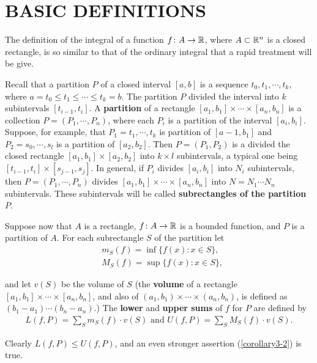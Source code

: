 \section[\textsc{basic definitions}]{BASIC DEFINITIONS}
The definition of the integral of a function $f\colon{} A\to \mathbb{R}$, where $A\subset \mathbb{R}^n$
is a closed rectangle, is so similar to that of the ordinary integral that 
a rapid treatment will be give.

Recall that a partition $P$ of a closed interval $[a,b]$ is a
sequence $t_0, t_1, \cdots, t_k$, where $a=t_0\le t_1 \le \cdots \le t_k=b$.
The partition $P$ divided the interval into $k$ subintervals $[t_{i-1}, t_i]$.
A \textbf{partition} of a rectangle $[a_1, b_1]\times \cdots \times [a_n, b_n]$
is a collection $P=(P_1, \cdots, P_n)$, where each $P_i$ is a partition of the interval 
$[a_i, b_i]$. Suppose, for example, that $P_1=t_1,\cdots, t_k$ is partition of 
$[a-1, b_1]$ and $P_2=s_0, \cdots, s_l$ is a partition of $[a_2, b_2]$. Then 
$P=(P_1, P_2)$ is a divided the closed rectangle $[a_1, b_1]\times [a_2,b_2]$ into 
$k\times l$ subintervals, a typical one being $[t_{i-1}, t_i]\times [s_{j-1}, s_j]$.
In general, if $P_i$ divides $[a_i, b_i]$ into $N_i$ subintervals, then 
$P=(P_1, \cdots, P_n)$ divides $[a_1, b_1]\times \cdots \times [a_n, b_n]$ into 
$N = N_1 \cdots N_n$ subintervals. These subintervals will be called 
\textbf{subrectangles of the partition} $P$. 

Suppose now that $A$ is a rectangle, $f\colon{} A\to \mathbb{R}$ is a bounded function, and $P$ is a 
partition of $A$. For each subrectangle $S$ of the partition let
\begin{align*}
    & {m}_S(f) = \inf \{f(x):x\in S\},\\
    & {M}_S(f) = \sup \{f(x):x\in S\},
\end{align*}

and let $v(S)$ be the volume of $S$ (the \textbf{volume} of a rectangle 
$[a_1, b_1]\times \cdots\times [a_n, b_n]$, and also of $(a_1, b_1)\times \cdots\times (a_n, b_n)$,
is defined as $(b_1-a_1)\cdots (b_n-a_n)$.) The \textbf{lower} and \textbf{upper sums} of $f$ 
for $P$ are defined by
\begin{align*}
    L(f, P) 
    = \sum_{S }^{}{m_S(f)\cdot v(S)} \text{ and } 
    U(f, P) = \sum_{S}^{}{M_S(f)\cdot v(S)}.
\end{align*}

Clearly $L(f, P)\le U(f, P)$, and an even stronger assertion (\ref{corollary3-2})
is true.

